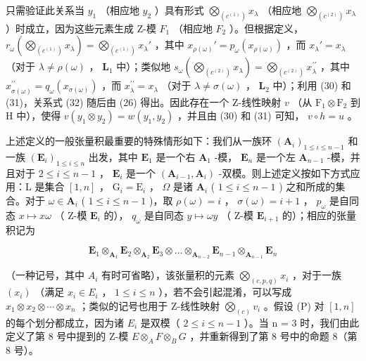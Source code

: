 只需验证此关系当 \(y_{1}\) （相应地 \(y_{2}\) ）具有形式 \(\bigotimes_{(c^{(1)})} x_{\lambda}\) （相应地 \(\bigotimes_{(c^{(2)})} x_{\lambda}\) ）时成立，因为这些元素生成 Z-模 \(F_{1}\) （相应地 \(F_{2}\) ）。但根据定义， \(r_{\omega}\left(\bigotimes_{(c^{(1)})} x_{\lambda}\right) = \bigotimes_{(c^{(1)})} x_{\lambda}'\) ，其中 \(x_{\rho(\omega)}' = p_{\omega}(x_{\rho(\omega)})\) ，而 \(x_{\lambda}' = x_{\lambda}\) （对于 \(\lambda \neq \rho (\omega)\) ， \(\mathbf{L}_1\) 中）；类似地 \(s_{\omega}\left(\bigotimes_{(c^{(2)})}x_{\lambda}\right) = \bigotimes_{(c^{(2)})}x_{\lambda}^{\prime \prime}\) ，其中 \(x_{\sigma (\omega)}^{\prime \prime} = q_{\omega}(x_{\sigma (\omega)})\) ，而 \(x_{\lambda}^{\prime \prime} = x_{\lambda}\) （对于 \(\lambda \neq \sigma (\omega)\) ， \(\mathbf{L}_2\) 中）；利用 (30) 和 (31)，关系式 (32) 随后由 (26) 得出。因此存在一个 Z-线性映射 \(v\) （从 \(\mathrm{F}_1\otimes \mathrm{F}_2\) 到 H 中），使得 \(v(y_{1}\otimes y_{2}) = w(y_{1},y_{2})\) ，并且由 (30) 和 (31) 可知， \(v\circ h = u\) 。

上述定义的一般张量积最重要的特殊情形如下：我们从一族环 \((\mathbf{A}_i)_{1\leqslant i\leqslant n - 1}\) 和一族 \((\mathbf{E}_i)_{1\leqslant i\leqslant n}\) 出发，其中 \(\mathbf{E}_1\) 是一个右 \(\mathbf{A}_1\) -模， \(\mathbf{E}_n\) 是一个左 \(\mathbf{A}_{n - 1}\) -模，并且对于 \(2\leqslant i\leqslant n - 1\) ， \(\mathbf{E}_i\) 是一个 \((\mathbf{A}_{i - 1},\mathbf{A}_i)\) -双模。则上述定义按如下方式应用：L 是集合 \([1,n]\) ， \(\mathrm{G}_i = \mathrm{E}_i\) ， \(\Omega\) 是诸 \(\mathbf{A}_i\) ( \(1\leqslant i\leqslant n - 1\) ) 之和所成的集合。对于 \(\omega \in \mathbf{A}_i\) ( \(1\leqslant i\leqslant n - 1\) )，取 \(\rho (\omega) = i\) ， \(\sigma (\omega) = i + 1\) ， \(p_{\omega}\) 是自同态 \(x\mapsto x\omega\) （ Z-模 \(\mathbf{E}_i\) 的）， \(q_{\omega}\) 是自同态 \(y\mapsto \omega y\) （ Z-模 \(\mathbf{E}_{i + 1}\) 的）；相应的张量积记为

\[
\mathbf {E} _ {1} \otimes_ {\mathbf {A} _ {1}} \mathbf {E} _ {2} \otimes_ {\mathbf {A} _ {2}} \mathbf {E} _ {3} \otimes \dots \otimes_ {\mathbf {A} _ {n - 2}} \mathbf {E} _ {n - 1} \otimes_ {\mathbf {A} _ {n - 1}} \mathbf {E} _ {n}\tag{33}
\]

（一种记号，其中 \(A_{i}\) 有时可省略），该张量积的元素 \(\bigotimes_{(c,p,q)} x_{i}\) ，对于一族 \((x_{i})\) （满足 \(x_{i} \in E_{i}\) ， \(1 \leqslant i \leqslant n\) ），若不会引起混淆，可以写成 \(x_{1} \otimes x_{2} \otimes \cdots \otimes x_{n}\) ；类似的记号也用于 Z-线性映射 \(\bigotimes_{(c)} v_{i}\) 。假设 (P) 对 \([1,n]\) 的每个划分都成立，因为诸 \(E_{i}\) 是双模（ \(2 \leqslant i \leqslant n - 1\) ）。当 n = 3 时，我们由此定义了第 8 号中提到的 Z-模 \(E \otimes_{A} F \otimes_{B} G\) ，并重新得到了第 8 号中的命题 8（第 8 号）。

